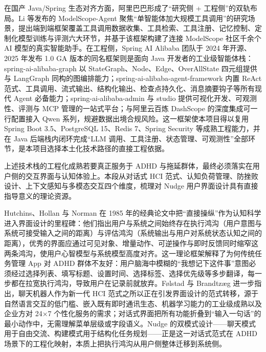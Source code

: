 \par 在国产 Java/Spring 生态对齐方面，阿里巴巴形成了``研究侧 + 工程侧''的双轨布局。Li 等发布的 ModelScope-Agent 聚焦``单智能体加大规模工具调用''的研究场景，提出端到端框架覆盖工具调用数据收集、工具检索、工具注册、记忆控制、定制化模型训练与评测六大环节，并基于该框架构建了连接 ModelScope 社区千余个 AI 模型的真实智能助手\cite{li2023modelscope}。在工程侧，Spring AI Alibaba 团队于 2024 年开源、2025 年发布 1.0 GA 版本的同名框架则是面向 Java 开发者的工业级智能体栈：spring-ai-alibaba-graph 以 StateGraph、Node、Edge、OverAllState 四元组提供与 LangGraph 同构的图编排能力；spring-ai-alibaba-agent-framework 内置 ReAct 范式、工具调用、流式输出、结构化输出、检查点持久化、消息摘要钩子等所有现代 Agent 必备能力；spring-ai-alibaba-admin 与 studio 提供可视化开发、可观测性、评测与 MCP 管理的一站式平台；与阿里云百炼 DashScope 的深度集成可一行配置接入 Qwen 系列，规避数据出境合规风险\cite{spring_ai_alibaba}。这一框架使本项目得以复用 Spring Boot 3.5、PostgreSQL 15、Redis 7、Spring Security 等成熟工程能力，并在 Java 后端栈内闭环完成``LLM 调用、工具注册、状态管理、可观测性''全部环节，是本项目选择本土化技术路径的直接工程依据。

\par 上述技术栈的工程化成熟若要真正服务于 ADHD 与拖延群体，最终必须落实在用户侧的交互界面与认知体验上。本段从对话式 HCI 范式、认知负荷管理、防挫败设计、上下文感知与多模态交互四个维度，梳理对 Nudge 用户界面设计具有直接指导意义的理论资源。

\par Hutchins、Hollan 与 Norman 在 1985 年的经典论文中把``直接操纵''作为认知科学进入界面设计的里程碑：他们指出用户与系统之间始终存在执行鸿沟（用户意图与系统可接受输入之间的距离）与评估鸿沟（系统输出与用户对系统状态认知之间的距离），优秀的界面应通过可见对象、增量动作、可逆操作与即时反馈同时缩窄这两条鸿沟，使用户心智模型与系统模型高度对齐\cite{hutchins1985direct}。这一理论框架解释了为何传统任务管理 App 对 ADHD 群体不友好：用户脑海中模糊的``我想记下这件事''意图必须经过选择列表、填写标题、设置时间、选择标签、选择优先级等多步翻译，每一步都在拉宽执行鸿沟，导致用户在记录前就放弃。Følstad 与 Brandtzæg 进一步指出，聊天机器人作为新一代 HCI 范式之所以正在引发界面设计的范式转移，源于自然语言交互的低门槛、嵌入既有即时通讯生态、机器学习能力的工业级成熟以及企业方对 24×7 个性化服务的需求；对话式界面把所有功能折叠到``输入一句话''的最小动作中，无需理解菜单层级或字段语义\cite{folstad2017chatbots}。Nudge 的双模式设计——聊天模式用于自由交流、构建模式用于结构化任务规划——正是这一对话式范式在 ADHD 场景下的工程化映射，本质上把执行鸿沟从用户侧整体迁移到系统侧。

